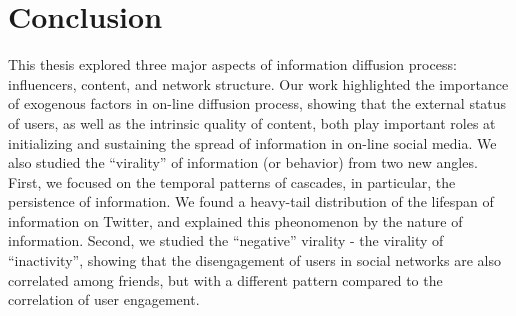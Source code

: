 \documentclass[phd,tocprelim]{cornell}
\begin{document}
\chapter{Conclusion}

This thesis explored three major aspects of information diffusion process: influencers, content, and network structure. Our work highlighted the importance of exogenous factors in on-line diffusion process, showing that the external status of users, as well as the intrinsic quality of content, both play important roles at initializing and sustaining the spread of information in on-line social media. We also studied the ``virality'' of information (or behavior) from two new angles. First, we focused on the temporal patterns of cascades, in particular, the persistence of information. We found a heavy-tail distribution of the lifespan of information on Twitter, and explained this pheonomenon by the nature of information. Second, we studied the ``negative'' virality - the virality of ``inactivity'', showing that the disengagement of users in social networks are also correlated among friends, but with a different pattern compared to the correlation of user engagement. 
\end{document}
